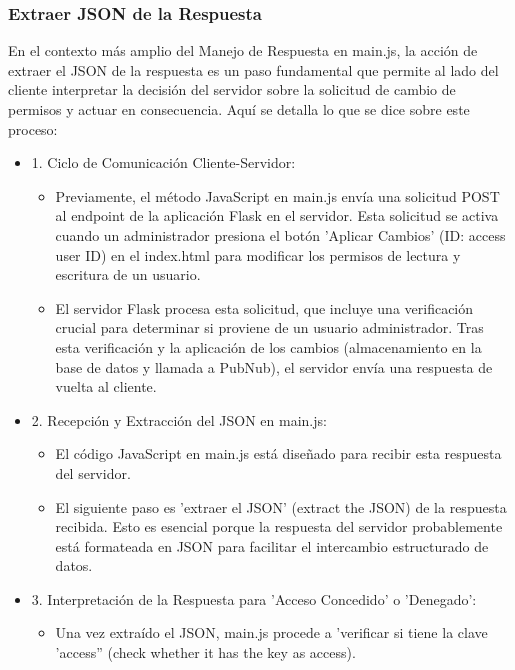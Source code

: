 \documentclass{report}
\begin{document}
\subsubsection{Extraer JSON de la Respuesta}
En el contexto más amplio del Manejo de Respuesta en main.js, la acción de extraer el JSON de la respuesta es un paso fundamental 
que permite al lado del cliente interpretar la decisión del servidor sobre la solicitud de cambio de permisos y actuar en consecuencia.
Aquí se detalla lo que se dice sobre este proceso:
\begin{itemize}
    \item 1. Ciclo de Comunicación Cliente-Servidor:
        \begin{itemize}
            \item Previamente, el método JavaScript en main.js envía una solicitud POST al endpoint de la aplicación Flask en el servidor. 
            Esta solicitud se activa cuando un administrador presiona el botón 'Aplicar Cambios' (ID: access user ID) en el index.html para 
            modificar los permisos de lectura y escritura de un usuario.
            \item El servidor Flask procesa esta solicitud, que incluye una verificación crucial para determinar si proviene de un usuario 
            administrador. Tras esta verificación y la aplicación de los cambios (almacenamiento en la base de datos y llamada a PubNub), el 
            servidor envía una respuesta de vuelta al cliente.
        \end{itemize}
    \item 2. Recepción y Extracción del JSON en main.js:
        \begin{itemize}
            \item El código JavaScript en main.js está diseñado para recibir esta respuesta del servidor.
            \item El siguiente paso es 'extraer el JSON' (extract the JSON) de la respuesta recibida. Esto es esencial porque la respuesta del 
            servidor probablemente está formateada en JSON para facilitar el intercambio estructurado de datos.
        \end{itemize}
    \item 3. Interpretación de la Respuesta para 'Acceso Concedido' o 'Denegado':
        \begin{itemize}
            \item Una vez extraído el JSON, main.js procede a 'verificar si tiene la clave 'access'' (check whether it has the key as access).

\end{itemize}
\end{itemize}
\end{document}
